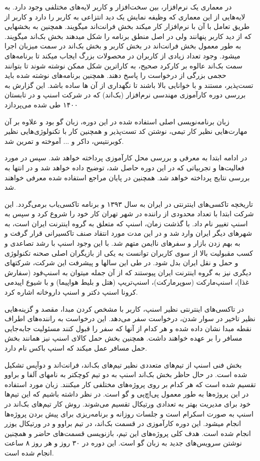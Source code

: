 \documentclass[a4]{report}
\begin{document}
در معماری یک نرم‌افزار، بین سخت‌افزار و کاربر لایه‌های مختلفی وجود دارد. به لایه‌هایی از این معماری که
وظیفه نمایش یک دید انتزاعی به کاربر را دارد و کاربر از طریق تعامل با آن با نرم‌افزار کار میکند بخش فرانت‌اند
میگویند. همچنین به بخشهایی که از دید کاربر پنهانند ولی در اصل منطق برنامه را شکل میدهند بخش بک‌اند
میگویند. به طور معمول بخش فرانت‌اند در بخش کاربر و بخش بک‌اند در سمت میزبان اجرا میشود.
 وجود تعداد زیادی از کاربران در محصولات بزرگ ایجاب میکند تا برنامه‌های سمت بک‌اند عالوه بر کارکرد
صحیح، به کارا‌ترین شکل ممکن نوشته شوند تا بتوانند حجمی بزرگی از درخواست را پاسخ دهند. همچنین
برنامه‌های نوشته شده باید تست‌پذیر، مستند و با خوانایی بالا باشند تا نگهداری از آن ها ساده باشد.
این گزارش به بررسی دوره کارآموزی مهندسی نرم‌افزار (بک‌اند) که در شرکت اسنپ و در تابستان ۱۴۰۰ طی شده می‌پردازد

زبان برنامه‌نویسی اصلی استفاده شده در این دوره، زبان گو بود و علاوه بر آن مهارت‌هایی نظیر کار تیمی، نوشتن کد تست‌پذیر و همچنین کار با تکنولوژی‌هایی نظیر کوبرنتیس، داکر و ... آموخته و تمرین شد.

در ادامه ابتدا به معرفی و بررسی محل کارآموزی پرداخته خواهد شد. سپس در مورد فعالیت‌ها و تجربیاتی که
در این دوره حاصل شد، توضیح داده خواهد شد و در انتها به بررسی نتایج پرداخته خواهد شد. همچنین در پایان
مراجع استفاده شده معرفی خواهند شد.

تاریخچه تاکسی‌های اینترنتی در ایران به سال ۱۳۹۳ و برنامه تاکسی‌یاب برمی‌گردد. این شرکت ابتدا با
تعداد محدودی از راننده در شهر تهران کار خود را شروع کرد و سپس به اسنپ تغییر نام داد.
با گذشت زمان، اسنپ که متعلق به گروه اینترنت ایران است، به شهرهای دیگر ایران وارد شد و در این مدت مورد انتقاد صنف تاکسیرانی
قرار گرفت و به بهم زدن بازار و سفرهای ناایمن متهم شد. با این وجود اسنپ با رشد تصاعدی و کسب مقبولیت
بالا از سوی کاربران توانست به یکی از بازیگران اصلی صحنه تکنولوژی و حمل و نقل ایران بدل شود. در طی این
سالها و پیشرفت این شرکت، شرکتهای دیگری نیز به گروه اینترنت ایران پیوستند که از آن جمله میتوان به
اسنپ‌فود (سفارش غذا)، اسنپ‌مارکت (سوپرمارکت)، اسنپ‌تریپ (هتل و بلیط هواپیما) و با شیوع اپیدمی کرونا اسنپ دکتر و اسنپ داروخانه اشاره کرد.

در تاکسی‌های اینترنتی نظیر اسنپ، کاربر با مشخص کردن مبدا، مقصد و گزینه‌هایی نظیر تاخیر در سوار
شدن، درخواست سفر می‌دهد. این درخواست به راننده‌های اطراف نقطه مبدا نشان داده شده و هر کدام از آنها
که سفر را قبول کنند مسئولیت جابه‌جایی مسافر را بر عهده خواهند داشت. همچنین بخش حمل کالای اسنپ
نیز همانند بخش حمل مسافر عمل میکند که اسنپ باکس نام دارد.

بخش فنی اسنپ از تیم‌های متعددی نظیر تیم‌های بک‌اند، فرانت‌اند و دوآپس
تشکیل شده است. در حال حاظر بخش بک‌اند اسنپ به دو تیم کوچکتر به نامهای آلفا و براوو تقسیم شده است که هر کدام بر روی پروژه‌های مختلفی کار میکنند. زبان مورد استفاده در این پروژه‌ها به طور معمول پی‌اچ‌پی و گو است.
در نظر داشته باشیم که این تیم‌ها خود برای مدیریت بهتر به تعدادی ورتیکال تقسیم می‌شوند.
روش کار تیم‌های بک‌اند در اسنپ به صورت اسکرام است و جلسات روزانه و برنامه‌ریزی برای پیش بردن پروژه‌ها انجام میشود.
این دوره کارآموزی در قسمت بک‌اند، در تیم براوو و در ورتیکال یوزر انجام شده است. هدف کلی پروژه‌های این تیم، بازنویسی
قسمت‌های حاضر و همچنین نوشتن سرویس‌های جدید به زبان گو است. این دوره در ۳۰ روز و هر روز ۸ ساعت انجام شده است.
\end{document}
